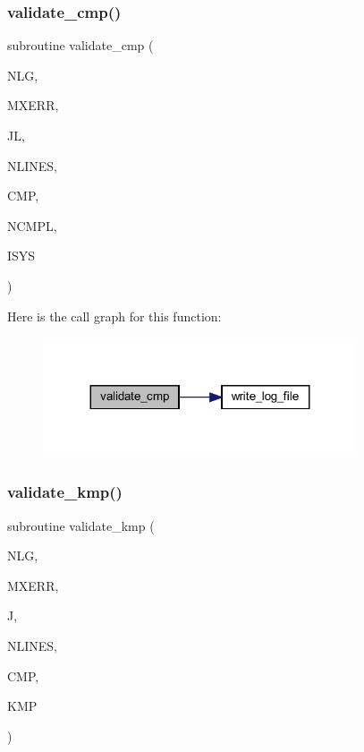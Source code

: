 \subsubsection{\texorpdfstring{validate\+\_\+cmp()}{validate\_cmp()}}
{\footnotesize\ttfamily subroutine validate\+\_\+cmp (\begin{DoxyParamCaption}\item[{integer}]{N\+LG,  }\item[{integer}]{M\+X\+E\+RR,  }\item[{integer}]{JL,  }\item[{integer}]{N\+L\+I\+N\+ES,  }\item[{integer, dimension(nlines)}]{C\+MP,  }\item[{integer, dimension(nlines)}]{N\+C\+M\+PL,  }\item[{integer}]{I\+S\+YS }\end{DoxyParamCaption})}

Here is the call graph for this function\+:\nopagebreak
\begin{figure}[H]
\begin{center}
\leavevmode
\includegraphics[width=263pt]{Leroi__c_8f90_aa934c3b9754a6a8e18f83b6de33a0df8_cgraph}
\end{center}
\end{figure}
\mbox{\label{Leroi__c_8f90_a2cd90fa43f6deaeb4a86b02b8494d638}} 
\subsubsection{\texorpdfstring{validate\+\_\+kmp()}{validate\_kmp()}}
{\footnotesize\ttfamily subroutine validate\+\_\+kmp (\begin{DoxyParamCaption}\item[{integer}]{N\+LG,  }\item[{integer}]{M\+X\+E\+RR,  }\item[{integer}]{J,  }\item[{integer}]{N\+L\+I\+N\+ES,  }\item[{integer, dimension(nlines)}]{C\+MP,  }\item[{integer, dimension(nlines)}]{K\+MP }\end{DoxyParamCaption})}

